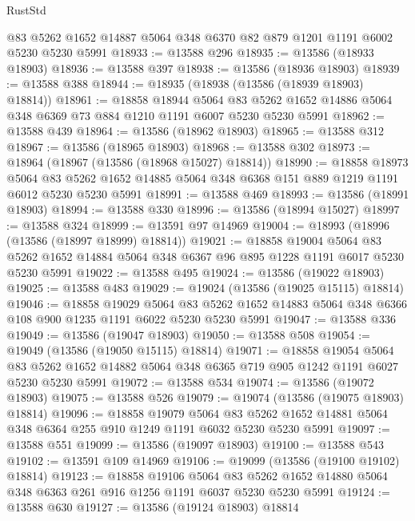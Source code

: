 \begin{lexlean}{RustStd}
\begin{coremodule}
    @83
    @5262
    @1652
    @14887
    @5064
    @348
    @6370
    @82
    @879
    @1201
    @1191
    @6002
    @5230
    @5230
    @5991
@18933 := @13588 @296
@18935 := @13586 (@18933 @18903)
@18936 := @13588 @397
@18938 := @13586 (@18936 @18903)
@18939 := @13588 @388
@18944 := @18935 (@18938 (@13586 (@18939 @18903) @18814))
@18961 := @18858
    @18944
    @5064
    @83
    @5262
    @1652
    @14886
    @5064
    @348
    @6369
    @73
    @884
    @1210
    @1191
    @6007
    @5230
    @5230
    @5991
@18962 := @13588 @439
@18964 := @13586 (@18962 @18903)
@18965 := @13588 @312
@18967 := @13586 (@18965 @18903)
@18968 := @13588 @302
@18973 := @18964 (@18967 (@13586 (@18968 @15027) @18814))
@18990 := @18858
    @18973
    @5064
    @83
    @5262
    @1652
    @14885
    @5064
    @348
    @6368
    @151
    @889
    @1219
    @1191
    @6012
    @5230
    @5230
    @5991
@18991 := @13588 @469
@18993 := @13586 (@18991 @18903)
@18994 := @13588 @330
@18996 := @13586 (@18994 @15027)
@18997 := @13588 @324
@18999 := @13591 @97 @14969
@19004 := @18993 (@18996 (@13586 (@18997 @18999) @18814))
@19021 := @18858
    @19004
    @5064
    @83
    @5262
    @1652
    @14884
    @5064
    @348
    @6367
    @96
    @895
    @1228
    @1191
    @6017
    @5230
    @5230
    @5991
@19022 := @13588 @495
@19024 := @13586 (@19022 @18903)
@19025 := @13588 @483
@19029 := @19024 (@13586 (@19025 @15115) @18814)
@19046 := @18858
    @19029
    @5064
    @83
    @5262
    @1652
    @14883
    @5064
    @348
    @6366
    @108
    @900
    @1235
    @1191
    @6022
    @5230
    @5230
    @5991
@19047 := @13588 @336
@19049 := @13586 (@19047 @18903)
@19050 := @13588 @508
@19054 := @19049 (@13586 (@19050 @15115) @18814)
@19071 := @18858
    @19054
    @5064
    @83
    @5262
    @1652
    @14882
    @5064
    @348
    @6365
    @719
    @905
    @1242
    @1191
    @6027
    @5230
    @5230
    @5991
@19072 := @13588 @534
@19074 := @13586 (@19072 @18903)
@19075 := @13588 @526
@19079 := @19074 (@13586 (@19075 @18903) @18814)
@19096 := @18858
    @19079
    @5064
    @83
    @5262
    @1652
    @14881
    @5064
    @348
    @6364
    @255
    @910
    @1249
    @1191
    @6032
    @5230
    @5230
    @5991
@19097 := @13588 @551
@19099 := @13586 (@19097 @18903)
@19100 := @13588 @543
@19102 := @13591 @109 @14969
@19106 := @19099 (@13586 (@19100 @19102) @18814)
@19123 := @18858
    @19106
    @5064
    @83
    @5262
    @1652
    @14880
    @5064
    @348
    @6363
    @261
    @916
    @1256
    @1191
    @6037
    @5230
    @5230
    @5991
@19124 := @13588 @630
@19127 := @13586 (@19124 @18903) @18814

\end{coremodule}
\end{lexlean}
